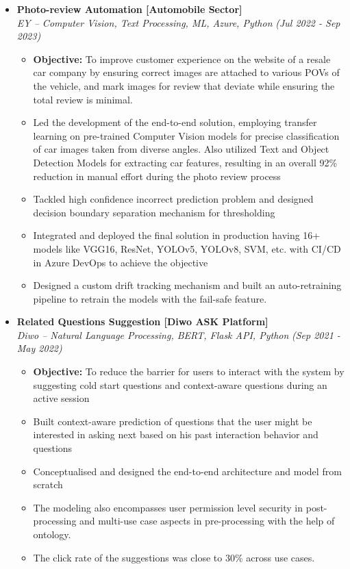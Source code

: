 \documentclass[a4paper,10pt]{article}
\newcommand{\isep}{-2 pt}
\begin{document}
\begin{itemize}
\item \textbf{Photo-review Automation [Automobile Sector]}  \\
    \emph{EY -- Computer Vision, Text Processing, ML, Azure, Python} \hfill {\emph{(Jul 2022 - Sep 2023)}}
    \\[-0.5cm]
    \begin{itemize}\itemsep \isep
    	\item \textbf{Objective:} To improve customer experience on the website of a resale car company by ensuring correct images are attached to various POVs of the vehicle, and mark images for review that deviate while ensuring the total review is minimal.   
        \item Led the development of the end-to-end solution, employing transfer learning on pre-trained Computer Vision models for precise classification of car images taken from diverse angles. Also utilized Text and Object Detection Models for extracting car features, resulting in an overall 92\% reduction in manual effort during the photo review process
        \item Tackled high confidence incorrect prediction problem and designed decision boundary separation mechanism for thresholding
        \item Integrated and deployed the final solution in production having 16+ models like VGG16, ResNet, YOLOv5, YOLOv8, SVM, etc. with CI/CD in Azure DevOps to achieve the objective
        \item Designed a custom drift tracking mechanism and built an auto-retraining pipeline to retrain the models with the fail-safe feature.
        \\ [-0.5cm]
    \end{itemize}

\item \textbf{Related Questions Suggestion [Diwo ASK Platform]}  \\
    \emph{Diwo -- Natural Language Processing, BERT, Flask API, Python} \hfill {\emph{(Sep 2021 - May 2022)}}
    \\[-0.5cm]
    \begin{itemize}\itemsep \isep
    	\item \textbf{Objective:} To reduce the barrier for users to interact with the system by suggesting cold start questions and context-aware questions during an active session 
        \item Built context-aware prediction of questions that the user might be interested in asking next based on his past interaction behavior and questions
        \item Conceptualised and designed the end-to-end architecture and model from scratch 
        \item The modeling also encompasses user permission level security in post-processing and multi-use case aspects in pre-processing with the help of ontology. 
        \item The click rate of the suggestions was close to 30\% across use cases.
        \\ [-0.5cm]
    \end{itemize}


\end{itemize}
\end{document}
